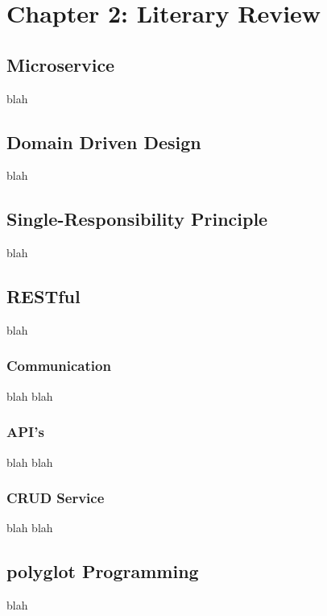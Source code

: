 \section{Chapter 2: Literary Review}
	\subsection{Microservice}
	blah
	\subsection{Domain Driven Design}
	blah
	\subsection{Single-Responsibility Principle}
	blah
	\subsection{RESTful}
	blah
		\subsubsection{Communication}
		blah blah
		\subsubsection{API's}
		blah blah
		\subsubsection{CRUD Service}
		blah blah
	\subsection{polyglot Programming}
	blah
	